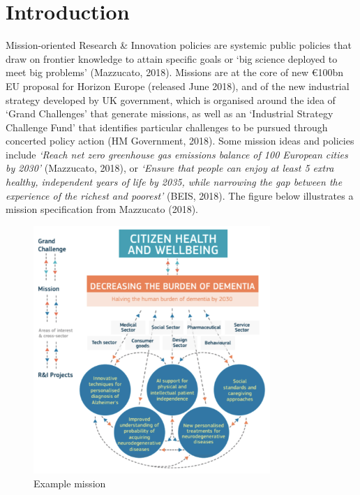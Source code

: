 \documentclass[11pt]{article}
\begin{document}
\section{Introduction}
\label{sec:introduction}

Mission-oriented Research \& Innovation policies are systemic public policies that draw on frontier knowledge to attain specific goals or `big science deployed to meet big problems' (Mazzucato, 2018). Missions are at the core of new €100bn EU proposal for Horizon Europe (released June 2018), and of the new industrial strategy developed by UK government, which is organised around the idea of `Grand Challenges’ that generate missions, as well as an `Industrial Strategy Challenge Fund’ that identifies particular challenges to be pursued through concerted policy action (HM Government, 2018). Some mission ideas and policies include \textit{`Reach net zero greenhouse gas emissions balance of 100 European cities
by 2030'} (Mazzucato, 2018), or \textit{`Ensure that people can enjoy at least 5 extra healthy, independent years of life by 2035, while narrowing the gap between the experience of the richest and poorest'} (BEIS, 2018). The figure below illustrates a mission specification from Mazzucato (2018).

\begin{figure}[!ht]
    \centering
    \includegraphics[width=0.8\textwidth]{figures/fig1_example.png}
    \caption{Example mission}
    \label{fig:my_label}
\end{figure}
\end{document}
